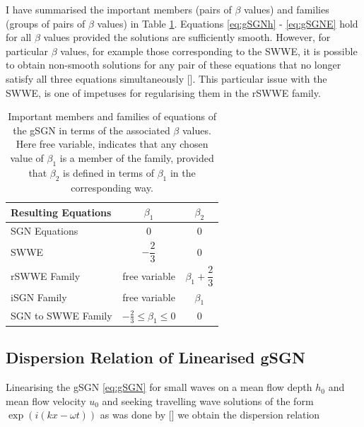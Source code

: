 \documentclass[10pt]{elsarticle}
\newcommand\T{\rule{0pt}{3ex }}       %
\begin{document}
I have summarised the important members (pairs of $\beta$ values) and families (groups of pairs of $\beta$ values) in Table \ref{Tab:gSGNFamilyMembers}. Equations \eqref{eq:gSGNh} - \eqref{eq:gSGNE} hold for all $\beta$ values provided the solutions are sufficiently smooth. However, for particular $\beta$ values, for example those corresponding to the SWWE, it is possible to obtain non-smooth solutions for any pair of these equations that no longer satisfy all three equations simultaneously []. This particular issue with the SWWE, is one of impetuses for regularising them in the rSWWE family. 

\begin{table}
	\centering
	\begin{tabular}{l | c | c}
		Resulting Equations &$\beta_1$ & $\beta_2$  \\
		\hline 
		\T SGN Equations & $0$ & $0$ \\
		\T SWWE & $-\dfrac{2}{3}$ & $0$ \\
		\T rSWWE Family & free variable & $\beta_1 + \dfrac{2}{3}$  \\
		\T iSGN Family & free variable & $\beta_1$ \\
		\T SGN to SWWE Family & $ -\frac{2}{3}\le\beta_1 \le 0$ & $0$
	\end{tabular}
	\caption{Important members and families of equations of the gSGN in terms of the associated $\beta$ values. Here free variable, indicates that any chosen value of $\beta_1$ is a member of the family, provided that $\beta_2$ is defined in terms of $\beta_1$ in the corresponding way.}
	\label{Tab:gSGNFamilyMembers}
\end{table}
%

\subsection{Dispersion Relation of Linearised gSGN}
Linearising the gSGN \eqref{eq:gSGN} for small waves on a mean flow depth $h_0$ and mean flow velocity $u_0$ and seeking travelling wave solutions of the form $\exp\left(i (k x - \omega t)\right)$ as was done by [] we obtain the dispersion relation
\end{document}
